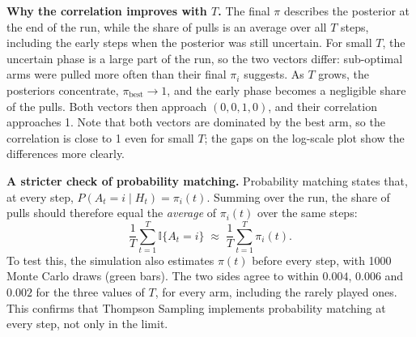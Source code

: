 \documentclass[12pt,a4paper]{article}
\begin{document}
\textbf{Why the correlation improves with $T$.}
The final $\pi$ describes the posterior at the end of the run, while the share of pulls is an average over all $T$ steps, including the early steps when the posterior was still uncertain.
For small $T$, the uncertain phase is a large part of the run, so the two vectors differ: sub-optimal arms were pulled more often than their final $\pi_i$ suggests.
As $T$ grows, the posteriors concentrate, $\pi_{\text{best}} \to 1$, and the early phase becomes a negligible share of the pulls.
Both vectors then approach $(0, 0, 1, 0)$, and their correlation approaches 1.
Note that both vectors are dominated by the best arm, so the correlation is close to 1 even for small $T$; the gaps on the log-scale plot show the differences more clearly.

\textbf{A stricter check of probability matching.} Probability matching states that, at every step, $P(A_t = i \mid H_t) = \pi_i(t)$.
Summing over the run, the share of pulls should therefore equal the \emph{average} of $\pi_i(t)$ over the same steps:
\[
\frac{1}{T}\sum_{t=1}^{T} \mathbb{I}\{A_t = i\} \;\approx\; \frac{1}{T}\sum_{t=1}^{T} \pi_i(t).
\]
To test this, the simulation also estimates $\pi(t)$ before every step, with 1000 Monte Carlo draws (green bars).
The two sides agree to within $0.004$, $0.006$ and $0.002$ for the three values of $T$, for every arm, including the rarely played ones.
This confirms that Thompson Sampling implements probability matching at every step, not only in the limit.
\end{document}
